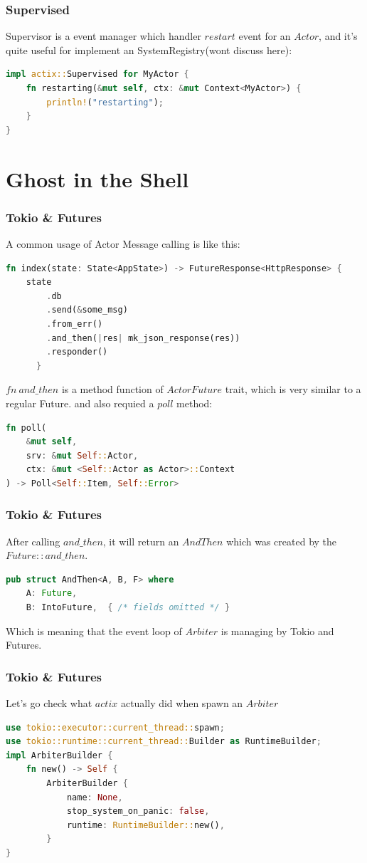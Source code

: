 \documentclass[notheorems, aspectratio=54]{beamer}
\begin{document}
\begin{frame}[fragile]
  \frametitle{Supervised}
  Supervisor is a event manager which handler $restart$ event for an $Actor$, and it's quite useful for implement an SystemRegistry(wont discuss here):
  \begin{lstlisting}[language=Rust]
impl actix::Supervised for MyActor {
    fn restarting(&mut self, ctx: &mut Context<MyActor>) {
        println!("restarting");
    }
}
  \end{lstlisting}

\end{frame}



\section{Ghost in the Shell}

\begin{frame}[fragile]
  \frametitle{Tokio \& Futures}
  A common usage of Actor Message calling is like this:
  \begin{lstlisting}[language=Rust]
  fn index(state: State<AppState>) -> FutureResponse<HttpResponse> {
    state
        .db
        .send(&some_msg)
        .from_err()
        .and_then(|res| mk_json_response(res))
        .responder()
      }
    \end{lstlisting}

    $fn\ and\_then$ is a method function of $ActorFuture$ trait, which is very similar to a regular Future.
    and also requied a $poll$ method:
    \begin{lstlisting}[language=Rust]
fn poll(
    &mut self,
    srv: &mut Self::Actor,
    ctx: &mut <Self::Actor as Actor>::Context
) -> Poll<Self::Item, Self::Error>
\end{lstlisting}
\end{frame}

\begin{frame}[fragile]
  \frametitle{Tokio \& Futures}
  After calling $and\_then$, it will return an $AndThen$ which was created by the $Future::and\_then$.
  \begin{lstlisting}[language=Rust]
  pub struct AndThen<A, B, F> where
    A: Future,
    B: IntoFuture,  { /* fields omitted */ }
  \end{lstlisting}
  Which is meaning that the event loop of $Arbiter$ is managing by Tokio and Futures.
\end{frame}

\begin{frame}[fragile]
  \frametitle{Tokio \& Futures}
  Let's go check what $actix$ actually did when spawn an $Arbiter$
  \begin{lstlisting}[language=Rust]
use tokio::executor::current_thread::spawn;
use tokio::runtime::current_thread::Builder as RuntimeBuilder;
impl ArbiterBuilder {
    fn new() -> Self {
        ArbiterBuilder {
            name: None,
            stop_system_on_panic: false,
            runtime: RuntimeBuilder::new(),
        }
}
  \end{lstlisting}
\end{frame}
\end{document}
